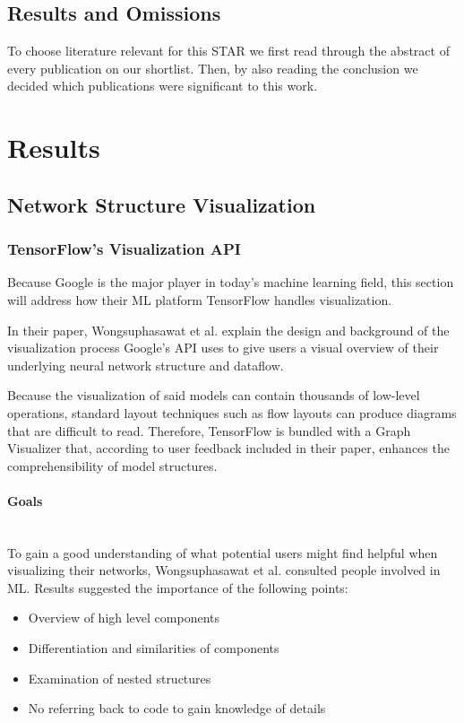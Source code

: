 \documentclass{acmsiggraph}               %
\newcommand{\paragraphbr}[1]{\paragraph{#1}\mbox{}\\}
\begin{document}
\subsection{Results and Omissions}
To choose literature relevant for this STAR we first read through the abstract of every publication on our shortlist. Then, by also reading the conclusion we decided which publications were significant to this work.

\section{Results}
\subsection{Network Structure Visualization}
\subsubsection{TensorFlow's Visualization API}
Because Google is the major player in today's machine learning field, this section will address how their ML platform TensorFlow handles visualization.

In their paper, Wongsuphasawat et al. explain the design and background of the visualization process Google's API uses to give users a visual overview of their underlying neural network structure and dataflow. \cite{Wongsuphasawat2018}

Because the visualization of said models can contain thousands of low-level operations, standard layout techniques such as flow layouts can produce diagrams that are difficult to read. Therefore, TensorFlow is bundled with a Graph Visualizer that, according to user feedback included in their paper, enhances the comprehensibility of model structures.

\paragraphbr{Goals}

To gain a good understanding of what potential users might find helpful when visualizing their networks, Wongsuphasawat et al. consulted people involved in ML. Results suggested the importance of the following points:

\begin{itemize}
  \setlength\itemsep{0em}
  \item Overview of high level components
  \item Differentiation and similarities of components
  \item Examination of nested structures
  \item No referring back to code to gain knowledge of details
\end{itemize}
\end{document}
